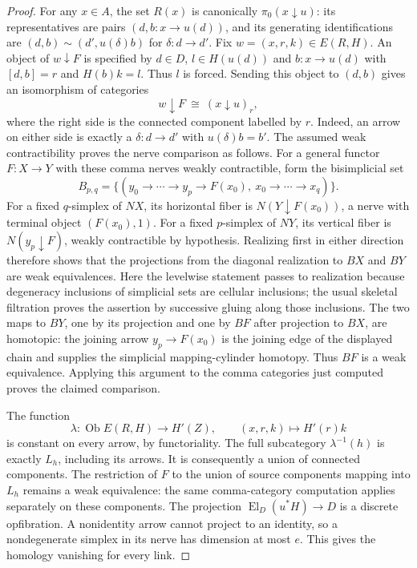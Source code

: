 \begin{proof}
For any $x\in A$, the set $R(x)$ is canonically
$\pi_0(x\downarrow u)$: its representatives are pairs $(d,b:x\to u(d))$,
and its generating identifications are
$(d,b)\sim(d',u(\delta)b)$ for $\delta:d\to d'$.
Fix $w=(x,r,k)\in E(R,H)$. An object of $w\downarrow F$ is specified by
$d\in D$, $l\in H(u(d))$ and $b:x\to u(d)$ with
$[d,b]=r$ and $H(b)k=l$. Thus $l$ is forced. Sending this object to
$(d,b)$ gives an isomorphism of categories
\[
 w\downarrow F\ \cong\ (x\downarrow u)_r,
\]
where the right side is the connected component labelled by $r$. Indeed,
an arrow on either side is exactly a $\delta:d\to d'$ with
$u(\delta)b=b'$. The assumed weak contractibility proves the nerve comparison as follows.
For a general functor $F:X\to Y$ with these comma nerves weakly
contractible, form the bisimplicial set
\[
 B_{p,q}=\{(y_0\to\cdots\to y_p\to F(x_0),\
                 x_0\to\cdots\to x_q)\}.
\]
For a fixed $q$-simplex of $NX$, its horizontal fiber is
$N(Y\downarrow F(x_0))$, a nerve with terminal object
$(F(x_0),1)$. For a fixed $p$-simplex of $NY$, its vertical fiber is
$N(y_p\downarrow F)$, weakly contractible by hypothesis. Realizing first
in either direction therefore shows that the projections from the
diagonal realization to $BX$ and $BY$ are weak equivalences. Here the
levelwise statement passes to realization because degeneracy inclusions
of simplicial sets are cellular inclusions; the usual skeletal
filtration proves the assertion by successive gluing along those
inclusions. The two maps to $BY$, one by its projection and one by
$BF$ after projection to $BX$, are homotopic: the joining arrow
$y_p\to F(x_0)$ is the joining edge of the displayed chain and supplies
the simplicial mapping-cylinder homotopy. Thus $BF$ is a weak
 equivalence. Applying this argument to the comma categories just
computed proves the claimed comparison.

The function
\[
 \lambda:\operatorname{Ob}E(R,H)\longrightarrow H'(Z),\qquad
 (x,r,k)\longmapsto H'(r)k
\]
is constant on every arrow, by functoriality. The full subcategory
$\lambda^{-1}(h)$ is exactly $L_h$, including its arrows. It is consequently
a union of connected components. The restriction of $F$ to the union of
source components mapping into $L_h$ remains a weak equivalence: the
same comma-category computation applies separately on these components.
The projection $\operatorname{El}_D(u^*H)\to D$ is a discrete opfibration.
A nonidentity arrow cannot project to an identity, so a nondegenerate
simplex in its nerve has dimension at most $e$. This gives the homology
vanishing for every link.


\end{proof}
